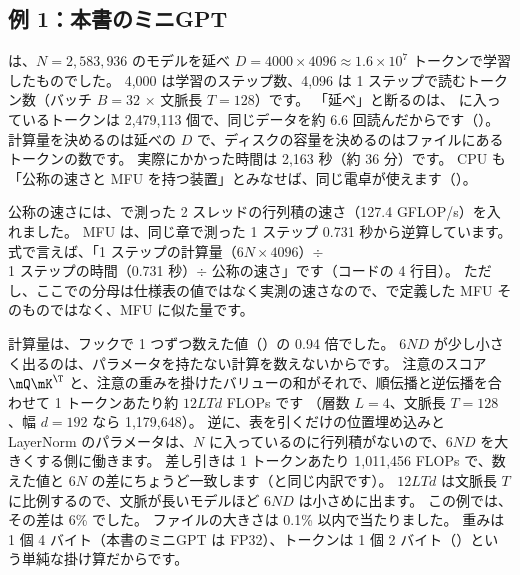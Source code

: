 \subsection*{例 1：本書のミニGPT}

 は、$N=2{,}583{,}936$ のモデルを延べ $D=4000\times4096\approx1.6\times10^{7}$ トークンで学習したものでした。
4,000 は学習のステップ数、4,096 は 1 ステップで読むトークン数（バッチ $B=32$ $\times$ 文脈長 $T=128$）です。
「延べ」と断るのは、 に入っているトークンは 2,479,113 個で、同じデータを約 6.6 回読んだからです（）。
計算量を決めるのは延べの $D$ で、ディスクの容量を決めるのはファイルにあるトークンの数です。
実際にかかった時間は 2,163 秒（約 36 分）です。
CPU も「公称の速さと MFU を持つ装置」とみなせば、同じ電卓が使えます（）。


公称の速さには、で測った 2 スレッドの行列積の速さ（127.4 GFLOP/s）を入れました。
MFU は、同じ章で測った 1 ステップ 0.731 秒から逆算しています。
式で言えば、「1 ステップの計算量（$6N\times4096$）$\div$ 1 ステップの時間（0.731 秒）$\div$ 公称の速さ」です（コードの 4 行目）。
ただし、ここでの分母は仕様表の値ではなく実測の速さなので、で定義した MFU そのものではなく、MFU に似た量です。


計算量は、フックで 1 つずつ数えた値（）の 0.94 倍でした。
$6ND$ が少し小さく出るのは、パラメータを持たない計算を数えないからです。
注意のスコア $\mQ\mK^\T$ と、注意の重みを掛けたバリューの和がそれで、順伝播と逆伝播を合わせて 1 トークンあたり約 $12LTd$ FLOPs です
（層数 $L=4$、文脈長 $T=128$、幅 $d=192$ なら 1,179,648）。
逆に、表を引くだけの位置埋め込みと LayerNorm のパラメータは、$N$ に入っているのに行列積がないので、$6ND$ を大きくする側に働きます。
差し引きは 1 トークンあたり 1,011,456 FLOPs で、数えた値と $6N$ の差にちょうど一致します（と同じ内訳です）。
$12LTd$ は文脈長 $T$ に比例するので、文脈が長いモデルほど $6ND$ は小さめに出ます。
この例では、その差は 6\% でした。
ファイルの大きさは 0.1\% 以内で当たりました。
重みは 1 個 4 バイト（本書のミニGPT は FP32）、トークンは 1 個 2 バイト（）という単純な掛け算だからです。

